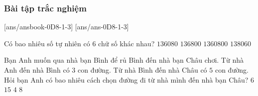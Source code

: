 \subsubsection{Bài tập trắc nghiệm}
[ans/ansbook-0D8-1-3]
[ans/ans-0D8-1-3]
\setcounter{ex}{0}
\begin{ex}%
	Có bao nhiêu số tự nhiên có $ 6  $ chữ số khác nhau?
	\choice
	{\True $ 136080 $}
	{$ 136800 $}
	{$ 1360800 $}
	{$ 138060 $}
\end{ex}
\begin{ex}%
	Bạn Anh muốn qua nhà bạn Bình để rủ Bình đến nhà bạn Châu chơi. Từ nhà Anh đến nhà Bình có $3$ con đường. Từ nhà Bình đến nhà Châu có $5$ con đường. Hỏi bạn Anh có bao nhiêu cách chọn đường đi từ nhà mình đến nhà bạn Châu?
	\choice
	{$6$}
	{\True $15$}
	{$4$}
	{$8$}
\end{ex}

